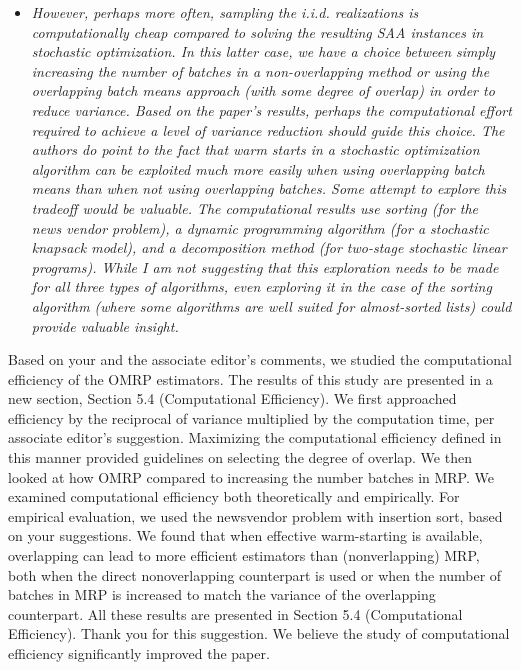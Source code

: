 \documentclass[11pt,notitlepage,onecolumn]{article}
\newcommand{\noi}{\noindent}
\begin{document}
\begin{itemize}
\item[] \textit{However, perhaps more often, sampling the i.i.d. realizations is computationally cheap compared to solving the resulting SAA instances in stochastic optimization. 
In this latter case, we have a choice between simply increasing the number of batches in a non-overlapping method or using the overlapping batch means approach (with some degree of overlap) in order to reduce variance.
Based on the paper's results, perhaps the computational effort required to achieve a level of variance reduction should guide this choice. 
The authors do point to the fact that warm starts in a stochastic
optimization algorithm can be exploited much more easily when using overlapping batch means than when not using overlapping batches. 
Some attempt to explore this tradeoff would be valuable. 
The computational results use sorting (for the news vendor problem), a dynamic programming algorithm (for a stochastic knapsack model), and a decomposition method (for two-stage stochastic linear programs). 
While I am not suggesting that this exploration needs to be made for all three types of algorithms, even exploring it in the case of the sorting algorithm (where some algorithms are well suited for almost-sorted lists) could provide valuable insight.}
\end{itemize}

\noi 
Based on your and the associate editor's comments, we studied the computational efficiency of the OMRP estimators. 
The results of this study are presented in a new section, Section 5.4 (Computational Efficiency).
We first approached efficiency by the reciprocal of variance multiplied by the computation time, per associate editor's suggestion. 
Maximizing the computational efficiency defined in this manner provided guidelines on selecting the degree of overlap. 
We then looked at how OMRP compared to increasing the number batches in MRP.
We examined computational efficiency both theoretically and empirically. 
For empirical evaluation, we used the newsvendor problem with insertion sort, based on your suggestions. 
We found that when effective warm-starting is available, overlapping can lead to more efficient estimators than (nonverlapping) MRP, both when the direct nonoverlapping counterpart is used or when the number of batches in MRP is increased to match the variance of the overlapping counterpart.  
All these results are presented in Section 5.4 (Computational Efficiency). 
Thank you for this suggestion. 
We believe the study of computational efficiency significantly improved the paper. 
\medskip
\end{document}
